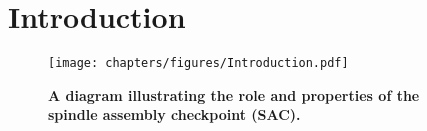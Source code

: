 \chapter{Introduction}
\label{chpt:introduction}

\begin{figure}
    \centering
    \texttt{[image: chapters/figures/Introduction.pdf]}
    \caption{\textbf{A diagram illustrating the role and properties of the spindle assembly checkpoint (SAC).}}
    \label{Introduction}
\end{figure}